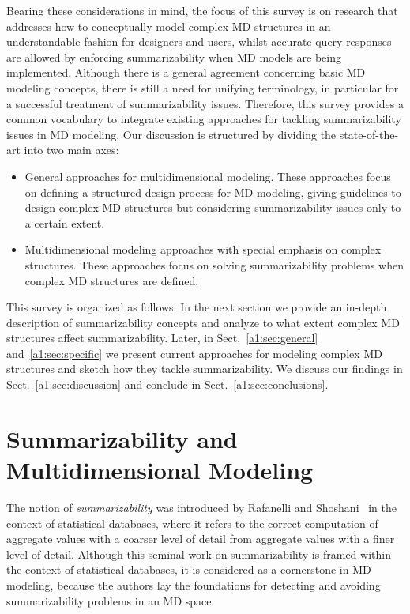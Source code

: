 Bearing these considerations in mind, the focus of this survey is on
research that addresses how to conceptually model complex MD
structures in an understandable fashion for designers and users,
whilst accurate query responses are allowed by enforcing
summarizability when MD models are being implemented. Although there
is a general agreement concerning basic MD modeling concepts, there
is still a need for unifying terminology, in particular for a
successful treatment of summarizability issues. Therefore, this
survey provides a common vocabulary to integrate existing approaches
for tackling summarizability issues in MD modeling. Our discussion
is structured by dividing the state-of-the-art into two main axes:
\begin{itemize}
\item General approaches for multidimensional modeling. These
approaches focus on defining a structured design process for MD
modeling, giving guidelines to design complex MD structures but
considering summarizability issues only to a certain extent.
\item Multidimensional modeling approaches with special emphasis on complex
structures. These approaches focus on solving summarizability
problems when complex MD structures are defined.
\end{itemize}

This survey is organized as follows.  In the next section we provide
an in-depth description of summarizability concepts and analyze to
what extent complex MD structures affect summarizability.  Later, in
Sect.~\ref{a1:sec:general} and~\ref{a1:sec:specific} we present
current approaches for modeling complex MD structures and sketch how
they tackle summarizability.  We discuss our findings in
Sect.~\ref{a1:sec:discussion} and conclude in
Sect.~\ref{a1:sec:conclusions}.



\section{Summarizability and Multidimensional Modeling}
\label{a1:sec:summarizability} The notion of \emph{summarizability}
was introduced by Rafa\-nelli and
Shoshani~\cite{DBLP:conf/ssdbm/RafanelliS90} in the context of
statistical databases, where it refers to the correct computation of
aggregate values with a coarser level of detail from aggregate
values with a finer level of detail. Although this seminal work on
summarizability is framed within the context of statistical
databases, it is considered as a cornerstone in MD modeling, because
the authors lay the foundations for detecting and avoiding
summarizability problems in an MD space.

